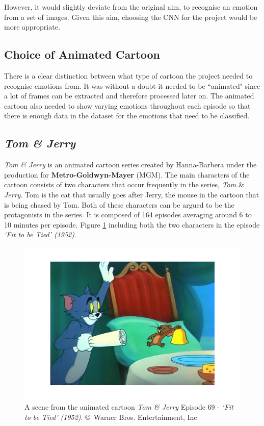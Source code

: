 \documentclass[report, 11pt, oneside]{dissertation}
\begin{document}
However, it would slightly deviate from the original aim, to recognise an emotion from a set of images. Given this aim, choosing the CNN for the project would be more appropriate.

\subsection{Choice of Animated Cartoon}

There is a clear distinction between what type of cartoon the project needed to recognise emotions from. It was without a doubt it needed to be ``animated" since a lot of frames can be extracted and therefore processed later on. The animated cartoon also needed to show varying emotions throughout each episode so that there is enough data in the dataset for the emotions that need to be classified.

\subsection{\textit{Tom \& Jerry}}

\textit{Tom \& Jerry} is an animated cartoon series created by Hanna-Barbera under the production for \textbf{Metro-Goldwyn-Mayer} (MGM). The main characters of the cartoon consists of two characters that occur frequently in the series, \textit{Tom} \& \textit{Jerry}. Tom is the cat that usually goes after Jerry, the mouse in the cartoon that is being chased by Tom. Both of these characters can be argued to be the protagonists in the series. It is composed of 164 episodes averaging around 6 to 10 minutes per episode. Figure \ref{fig:tom_and_jerry} including both the two characters in the episode \textit{`Fit to be Tied' (1952)}.

 \begin{figure}[!htb]
	\centering
	\includegraphics[scale=0.45]{figure_19.pdf}
	\caption[A scene from \textit{Tom \& Jerry}.]{A scene from the animated cartoon \textit{Tom \& Jerry} Episode 69 - \textit{`Fit to be Tied' (1952)}. \copyright \ Warner Bros. Entertainment, Inc}
	\label{fig:tom_and_jerry}
\end{figure}
\end{document}
